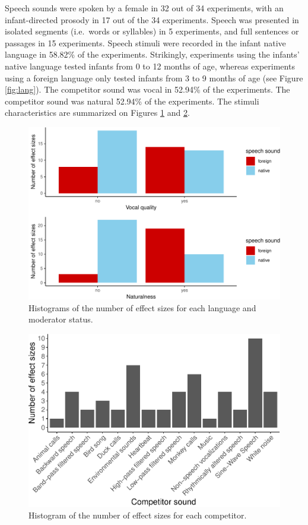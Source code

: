 \documentclass[man]{apa6}
\begin{document}
Speech sounds were spoken by a female in 32 out of 34 experiments, with an infant-directed prosody in 17 out of the 34 experiments. Speech was presented in isolated segments (i.e.~words or syllables) in 5 experiments, and full sentences or passages in 15 experiments. Speech stimuli were recorded in the infant native language in 58.82\% of the experiments. Strikingly, experiments using the infants' native language tested infants from 0 to 12 months of age, whereas experiments using a foreign language only tested infants from 3 to 9 months of age (see Figure \ref{fig:lang}).
The competitor sound was vocal in 52.94\% of the experiments. The competitor sound was natural 52.94\% of the experiments.
The stimuli characteristics are summarized on Figures \ref{fig:stimuli} and \ref{fig:competitors}.

\begin{figure}
\centering
\includegraphics{MA_speech_pref_files/figure-latex/stimuli-1.pdf}
\caption{\label{fig:stimuli}Histograms of the number of effect sizes for each language and moderator status.}
\end{figure}

\begin{figure}
\centering
\includegraphics{MA_speech_pref_files/figure-latex/competitors-1.pdf}
\caption{\label{fig:competitors}Histogram of the number of effect sizes for each competitor.}
\end{figure}
\end{document}
